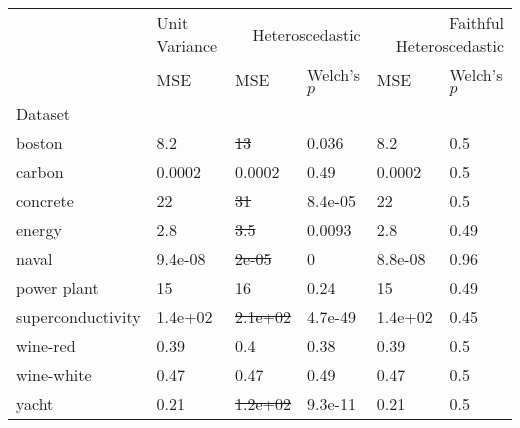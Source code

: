 \begin{tabular}{l|l|ll|ll}
\toprule
 & Unit Variance & \multicolumn{2}{r}{Heteroscedastic} & \multicolumn{2}{r}{Faithful Heteroscedastic} \\
 & MSE & MSE & Welch's $p$ & MSE & Welch's $p$ \\
Dataset &  &  &  &  &  \\
\midrule
boston & 8.2 & \sout{13} & 0.036 & 8.2 & 0.5 \\
carbon & 0.0002 & 0.0002 & 0.49 & 0.0002 & 0.5 \\
concrete & 22 & \sout{31} & 8.4e-05 & 22 & 0.5 \\
energy & 2.8 & \sout{3.5} & 0.0093 & 2.8 & 0.49 \\
naval & 9.4e-08 & \sout{2e-05} & 0 & 8.8e-08 & 0.96 \\
power plant & 15 & 16 & 0.24 & 15 & 0.49 \\
superconductivity & 1.4e+02 & \sout{2.1e+02} & 4.7e-49 & 1.4e+02 & 0.45 \\
wine-red & 0.39 & 0.4 & 0.38 & 0.39 & 0.5 \\
wine-white & 0.47 & 0.47 & 0.49 & 0.47 & 0.5 \\
yacht & 0.21 & \sout{1.2e+02} & 9.3e-11 & 0.21 & 0.5 \\
\bottomrule
\end{tabular}
